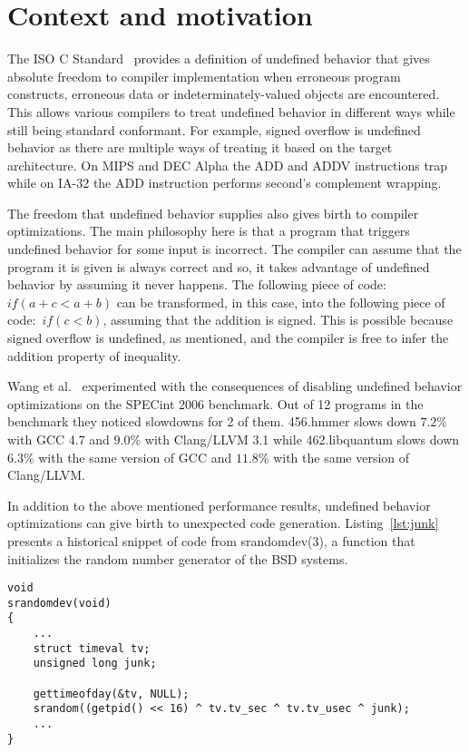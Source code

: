 \section{Context and motivation}

The ISO C Standard~\cite{iso90} provides a definition of undefined
behavior that gives absolute freedom to compiler implementation when
erroneous program constructs, erroneous data or indeterminately-valued
objects are encountered. This allows various compilers to treat
undefined behavior in different ways while still being standard
conformant. For example, signed overflow is undefined behavior as there
are multiple ways of treating it based on the target architecture. On
MIPS and DEC Alpha the ADD and ADDV instructions trap while on IA-32 the
ADD instruction performs second's complement wrapping.

The freedom that undefined behavior supplies also gives birth to
compiler optimizations. The main philosophy here is that a program that
triggers undefined behavior for some input is incorrect. The compiler
can assume that the program it is given is always correct and so, it
takes advantage of undefined behavior by assuming it never happens. The
following piece of code:~\textit{\(if (a + c < a + b)\)} can be
transformed, in this case, into the following piece of
code:~\textit{\(if (c < b)\)}, assuming that the addition is signed.
This is possible because signed overflow is undefined, as mentioned, and
the compiler is free to infer the addition property of inequality.

Wang et al.~\cite{wang2012undefined} experimented with the consequences
of disabling undefined behavior optimizations on the SPECint 2006
benchmark. Out of 12 programs in the benchmark they noticed slowdowns
for 2 of them. 456.hmmer slows down $7.2\%$ with GCC 4.7 and $9.0\%$
with Clang/LLVM 3.1 while 462.libquantum slows down $6.3\%$ with the
same version of GCC and $11.8\%$ with the same version of Clang/LLVM.

In addition to the above mentioned performance results, undefined
behavior optimizations can give birth to unexpected code generation.
Listing~\ref{lst:junk} presents a historical snippet of code from
srandomdev(3), a function that initializes the random number generator
of the BSD systems.

\begin{lstlisting}[style=Cstyle, caption={srandom function in
lib/libc/stdlib/random.c on BSD systems}, label={lst:junk}]
void
srandomdev(void)
{
	...
	struct timeval tv;
	unsigned long junk;

	gettimeofday(&tv, NULL);
	srandom((getpid() << 16) ^ tv.tv_sec ^ tv.tv_usec ^ junk);
	...
}
\end{lstlisting}

